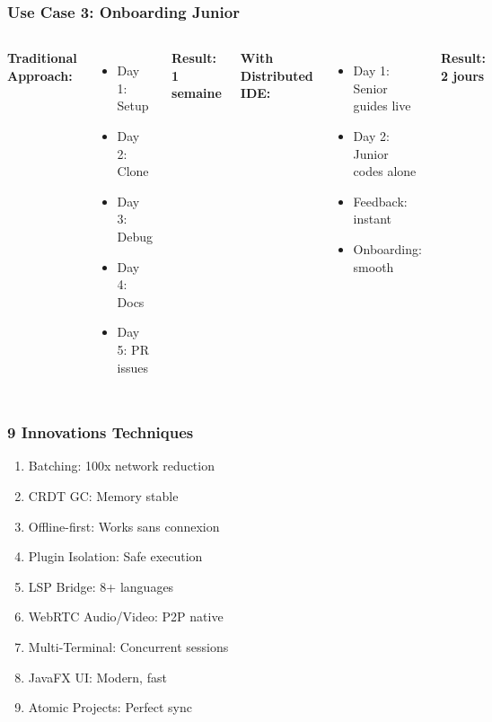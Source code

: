 \documentclass[aspectratio=16:9]{beamer}
\begin{document}
\begin{frame}
  \frametitle{Use Case 3: Onboarding Junior}
  
  \begin{columns}[T]
    
    \textbf{Traditional Approach:}
    \begin{itemize}
      \item Day 1: Setup
      \item Day 2: Clone
      \item Day 3: Debug
      \item Day 4: Docs
      \item Day 5: PR issues
    \end{itemize}
    
    \textbf{Result: 1 semaine}
    
    
    \textbf{With Distributed IDE:}
    \begin{itemize}
      \item Day 1: Senior guides live
      \item Day 2: Junior codes alone
      \item Feedback: instant
      \item Onboarding: smooth
    \end{itemize}
    
    \textbf{Result: 2 jours}
  \end{columns}
\end{frame}

\begin{frame}
  \frametitle{9 Innovations Techniques}
  
  \begin{enumerate}
    \item Batching: 100x network reduction
    \item CRDT GC: Memory stable
    \item Offline-first: Works sans connexion
    \item Plugin Isolation: Safe execution
    \item LSP Bridge: 8+ languages
    \item WebRTC Audio/Video: P2P native
    \item Multi-Terminal: Concurrent sessions
    \item JavaFX UI: Modern, fast
    \item Atomic Projects: Perfect sync
  \end{enumerate}
\end{frame}
\end{document}
